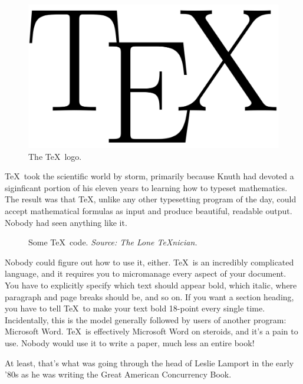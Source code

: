 \documentclass[ignorenonframetext]{beamer}
\begin{document}
\begin{frame}
  \begin{figure}
    \centering
    \includegraphics[width=4.5in]{images/tex.png}
    \caption{The \TeX\ logo.}
    \label{fig:texlogo}
  \end{figure}
\end{frame}

\TeX\ took the scientific world by storm, primarily because Knuth had
devoted a siginficant portion of his eleven years to learning how to
typeset mathematics.  The result was that \TeX, unlike any other
typesetting program of the day, could accept mathematical formulas as
input and produce beautiful, readable output.  Nobody had seen
anything like it.

\begin{frame}
  \begin{figure}
    \centering
    \lstset{language=TeX}
   \scriptsize
    
 \caption{Some \TeX\ code.  \emph{Source: The Lone \TeX{}nician.}}
    \label{fig:texcode}
  \end{figure}
\end{frame}

Nobody could figure out how to use it, either.  \TeX\ is an incredibly
complicated language, and it requires you to micromanage every aspect
of your document.  You have to explicitly specify which text should
appear bold, which italic, where paragraph and page breaks should be,
and so on.  If you want a section heading, you have to tell \TeX\ to
make your text bold 18-point every single time.  Incidentally, this is
the model generally followed by users of another program: Microsoft
Word.  \TeX\ is effectively Microsoft Word on steroids, and it's a
pain to use.  Nobody would use it to write a paper, much less an
entire book!

At least, that's what was going through the head of Leslie Lamport in
the early '80s as he was writing the Great American Concurrency Book.
\end{document}
